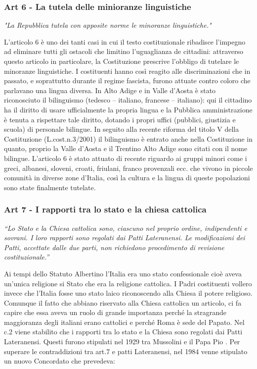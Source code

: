 \documentclass{report}
\begin{document}
\subsubsection{Art 6 - La tutela delle minioranze linguistiche}

\textit{"La Repubblica tutela con apposite norme le minoranze linguistiche."}

L’articolo 6 è uno dei tanti casi in cui il testo costituzionale ribadisce l’impegno ad eliminare tutti gli ostacoli che
limitino l’uguaglianza de cittadini: attraverso questo articolo in particolare, la Costituzione prescrive l’obbligo di
tutelare le minoranze linguistiche.
I costituenti hanno così reagito alle discriminazioni che in passato, e soprattutto durante il regime fascista, furono
attuate contro coloro che parlavano una lingua diversa.
In Alto Adige e in Valle d’Aosta è stato riconosciuto il bilinguismo (tedesco – italiano, francese – italiano): qui il
cittadino ha il diritto di usare ufficialmente la propria lingua e la Pubblica amministrazione è tenuta a rispettare tale
diritto, dotando i propri uffici (pubblici, giustizia e scuola) di personale bilingue.
In seguito alla recente riforma del titolo V della Costituzione (L.cost.n.3/2001) il bilinguismo è entrato anche nella
Costituzione in quanto, proprio la Valle d’Aosta e il Trentino Alto Adige sono citati con il nome bilingue.
L’articolo 6 è stato attuato di recente riguardo ai gruppi minori come i greci, albanesi, sloveni, croati, friulani, franco
provenzali ecc. che vivono in piccole comunità in diverse zone d’Italia, così la cultura e la lingua di queste popolazioni
sono state finalmente tutelate.



\subsubsection{Art 7 - I rapporti tra lo stato e la chiesa cattolica}

\textit{“Lo Stato e la Chiesa cattolica sono, ciascuno nel proprio ordine, indipendenti e sovrani.
I loro rapporti sono regolati dai Patti Lateranensi. Le modificazioni dei Patti, accettate dalle due parti, non richiedono
procedimento di revisione costituzionale.”}

Ai tempi dello Statuto Albertino l’Italia era uno stato confessionale cioè aveva un’unica religione si Stato che era la
religione cattolica.
I Padri costituenti vollero invece che l’Italia fosse uno stato laico riconoscendo alla Chiesa il potere religioso.
Comunque il fatto che abbiano riservato alla Chiesa cattolica un articolo, ci fa capire che essa aveva un ruolo
di grande importanza perché la stragrande maggioranza degli italiani erano cattolici e perché Roma è sede del Papato.
Nel c.2 viene stabilito che i rapporti tra lo stato e la Chiesa sono regolati dai Patti Lateranensi. Questi furono stipulati
nel 1929 tra Mussolini e il Papa Pio .
Per superare le contraddizioni tra art.7 e patti Lateranensi, nel 1984 venne stipulato un nuovo Concordato che
prevedeva:
\end{document}
